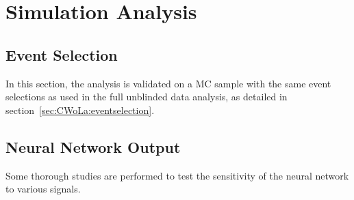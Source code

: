 


\FloatBarrier
\section{Simulation Analysis}
\label{sec:CWoLa:simulation_analysis}
\subsection{Event Selection}
In this section, the analysis is validated on a MC sample with the same event selections as used in the full unblinded data analysis, as detailed in section~\ref{sec:CWoLa:eventselection}.

\subsection{Neural Network Output}
\label{sec:CWoLa:simulation:NN}

Some thorough studies are performed to test the sensitivity of the neural network to various signals.

